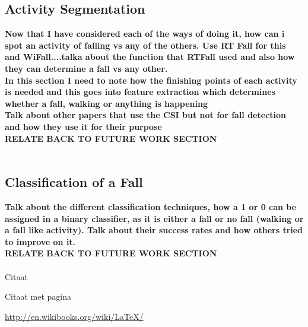 \subsection{Activity Segmentation}
\textbf{Now that I have considered each of the ways of doing it, how can i spot an activity of falling vs any of the others. Use RT Fall for this and WiFall....talka about the function that RTFall used and also how they can determine a fall vs any other. \\ In this section I need to note how the finishing points of each activity is needed and this goes into feature extraction which determines whether a fall, walking or anything is happening \\ Talk about other papers that use the CSI but not for fall detection and how they use it for their purpose \\ RELATE BACK TO FUTURE WORK SECTION} \\\\


\subsection{Classification of a Fall}
\textbf{Talk about the different classification techniques, how a 1 or 0 can be assigned in a binary classifier, as it is either a fall or no fall (walking or a fall like activity). Talk about their success rates and how others tried to improve on it. \\ RELATE BACK TO FUTURE WORK SECTION} \\\\















Citaat \cite{MScBuijs2010}

Citaat met pagina \cite[p.~10]{MScNugteren2010}

\url{http://en.wikibooks.org/wiki/LaTeX/}